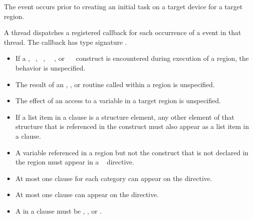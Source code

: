 
\events
{}

The  event occurs prior to creating an initial task on a target device for a target
region.

\tools
{}

A thread dispatches a registered 
callback for each occurrence of a  event
in that thread. The callback has type signature
.

\restrictions
\begin{itemize}
\item If a , ~,
~, ~~, or
~~ construct is encountered during
execution of a  region, the behavior is unspecified.

\item The result of an ,
, or 
routine called within a  region is unspecified.

\item The effect of an access to a  variable in a target region is
unspecified.

\item If a list item in a  clause is a structure element, any other
element of that structure that is referenced in the  construct
must also appear as a list item in a  clause.

\item A variable referenced in a  region but not the  construct that is not
declared in the  region must appear in a ~ directive.

\item At most one  clause for each category can appear on the directive.

\item At most one  clause can appear on the directive.

\item A  in a  clause must be , ,  or .


\end{itemize}
